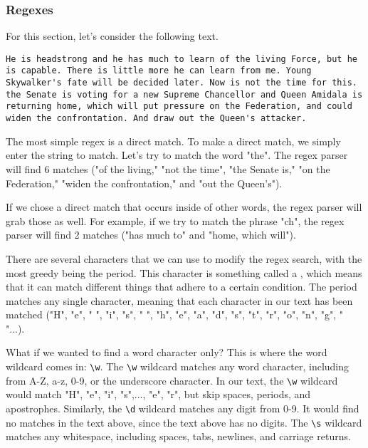 \subsubsection{Regexes}
For this section, let's consider the following text.
\begin{lstlisting}[style=none]
He is headstrong and he has much to learn of the living Force, but he is capable. There is little more he can learn from me. Young Skywalker's fate will be decided later. Now is not the time for this. the Senate is voting for a new Supreme Chancellor and Queen Amidala is returning home, which will put pressure on the Federation, and could widen the confrontation. And draw out the Queen's attacker.
\end{lstlisting}
The most simple regex is a direct match. To make a direct match, we simply enter the string to match. Let's try to match the word "the". The regex parser will find 6 matches ("of the living," "not the time", "the Senate is," "on the Federation," "widen the confrontation," and "out the Queen's").\par
If we chose a direct match that occurs inside of other words, the regex parser will grab those as well. For example, if we try to match the phrase "ch", the regex parser will find 2 matches ("has much to" and "home, which will").\par
There are several characters that we can use to modify the regex search, with the most greedy being the period. This character is something called a , which means that it can match different things that adhere to a certain condition. The period matches any single character, meaning that each character in our text has been matched ("H", "e", " ", "i", "s", " ", "h", "e", "a", "d", "s", "t", "r", "o", "n", "g", " "...).\par
What if we wanted to find a word character only? This is where the word wildcard comes in: \verb|\w|. The \verb|\w| wildcard matches any word character, including from A-Z, a-z, 0-9, or the underscore character. In our text, the \verb|\w| wildcard would match "H", "e", "i", "s",..., "e", "r", but skip spaces, periods, and apostrophes. Similarly, the \verb|\d| wildcard matches any digit from 0-9. It would find no matches in the text above, since the text above has no digits. The \verb|\s| wildcard matches any whitespace, including spaces, tabs, newlines, and carriage returns.\par
{}
